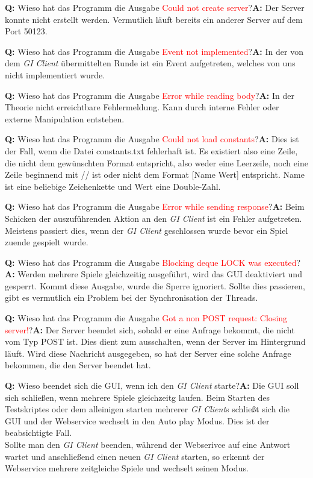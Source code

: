 \documentclass{article}
\newcommand{\faqentry}[2]{\noindent\textbf{Q:} #1\newline\newline\textbf{A:} #2\newline\newline\newline} %
\newcommand{\gquote}[1]{\glqq #1\grqq} %
\let\oldgls\gls
\renewcommand{\gls}[1]{\emph{\oldgls{#1}}} %
\begin{document}
\faqentry{Wieso hat das Programm die Ausgabe \textcolor{red}{Could not create server}?}{Der Server konnte nicht erstellt werden. Vermutlich läuft bereits ein anderer Server auf dem Port 50123.}

\faqentry{Wieso hat das Programm die Ausgabe \textcolor{red}{Event not implemented}?}{In der von dem \gls{GI Client} übermittelten Runde ist ein Event aufgetreten, welches von uns nicht implementiert wurde.}

\faqentry{Wieso hat das Programm die Ausgabe \textcolor{red}{Error while reading body}?}{In der Theorie nicht erreichtbare Fehlermeldung. Kann durch interne Fehler oder externe Manipulation entstehen.}

\faqentry{Wieso hat das Programm die Ausgabe \textcolor{red}{Could not load constants}?}{Dies ist der Fall, wenn die Datei \gquote{constants.txt} fehlerhaft ist. Es existiert also eine Zeile, die nicht dem gewünschten Format entspricht, also weder eine Leerzeile, noch eine Zeile beginnend mit \gquote{//} ist oder nicht dem Format [Name Wert] entspricht. Name ist eine beliebige Zeichenkette und Wert eine Double-Zahl.}

\faqentry{Wieso hat das Programm die Ausgabe \textcolor{red}{Error while sending response}?}{Beim Schicken der auszuführenden Aktion an den \gls{GI Client} ist ein Fehler aufgetreten. Meistens passiert dies, wenn der \gls{GI Client} geschlossen wurde bevor ein Spiel zuende gespielt wurde.}

\faqentry{Wieso hat das Programm die Ausgabe \textcolor{red}{Blocking deque LOCK was executed}?}{Werden mehrere Spiele gleichzeitig ausgeführt, wird das GUI deaktiviert und gesperrt. Kommt diese Ausgabe, wurde die Sperre ignoriert. Sollte dies passieren, gibt es vermutlich ein Problem bei der Synchronisation der Threads.}

\faqentry{Wieso hat das Programm die Ausgabe \textcolor{red}{Got a non POST request: Closing server!}?}{Der Server beendet sich, sobald er eine Anfrage bekommt, die nicht vom Typ POST ist. Dies dient zum ausschalten, wenn der Server im Hintergrund läuft. Wird diese Nachricht ausgegeben, so hat der Server eine solche Anfrage bekommen, die den Server beendet hat.}

\faqentry{Wieso beendet sich die GUI, wenn ich den \gls{GI Client}  starte?}{Die GUI soll sich schließen, wenn mehrere Spiele gleichzeitg laufen. Beim Starten des Testskriptes oder dem alleinigen starten mehrerer \gls{GI Client}s schließt sich die GUI und der Webservice wechselt in den \gquote{Auto play} Modus. Dies ist der beabsichtigte Fall.\\ Sollte man den \gls{GI Client} beenden, während der Webserivce auf eine Antwort wartet und anschließend einen neuen \gls{GI Client} starten, so erkennt der Webservice mehrere zeitgleiche Spiele und wechselt seinen Modus.}
\end{document}
